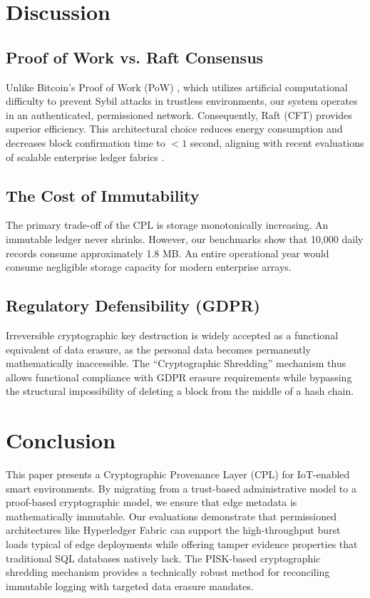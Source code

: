 \documentclass[conference]{IEEEtran}
\begin{document}
\section{Discussion}

\subsection{Proof of Work vs. Raft Consensus}
Unlike Bitcoin's Proof of Work (PoW) \cite{b17}, which utilizes artificial computational difficulty to prevent Sybil attacks in trustless environments, our system operates in an authenticated, permissioned network. Consequently, Raft (CFT) provides superior efficiency. This architectural choice reduces energy consumption and decreases block confirmation time to $<1$ second, aligning with recent evaluations of scalable enterprise ledger fabrics \cite{b18}.

\subsection{The Cost of Immutability}
The primary trade-off of the CPL is storage monotonically increasing. An immutable ledger never shrinks. However, our benchmarks show that 10,000 daily records consume approximately 1.8 MB. An entire operational year would consume negligible storage capacity for modern enterprise arrays. 

\subsection{Regulatory Defensibility (GDPR)}
Irreversible cryptographic key destruction is widely accepted as a functional equivalent of data erasure, as the personal data becomes permanently mathematically inaccessible. The ``Cryptographic Shredding'' mechanism thus allows functional compliance with GDPR erasure requirements \cite{b16} while bypassing the structural impossibility of deleting a block from the middle of a hash chain. 

\section{Conclusion}
This paper presents a Cryptographic Provenance Layer (CPL) for IoT-enabled smart environments. By migrating from a trust-based administrative model to a proof-based cryptographic model, we ensure that edge metadata is mathematically immutable. Our evaluations demonstrate that permissioned architectures like Hyperledger Fabric can support the high-throughput burst loads typical of edge deployments while offering tamper evidence properties that traditional SQL databases natively lack. The PISK-based cryptographic shredding mechanism provides a technically robust method for reconciling immutable logging with targeted data erasure mandates.
\end{document}
